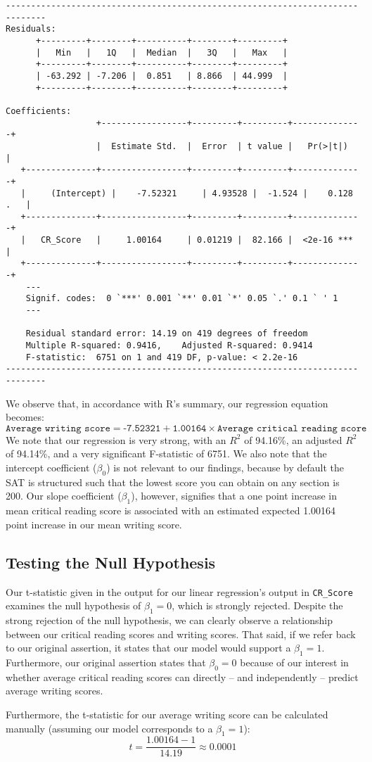 \documentclass[11pt]{article} %
\begin{document}
\begin{verbatim}
------------------------------------------------------------------------------
Residuals:
	  +---------+--------+----------+--------+---------+  
	  |   Min   |   1Q   |  Median  |   3Q   |   Max   |
	  +---------+--------+----------+--------+---------+  
	  | -63.292 | -7.206 |  0.851   | 8.866  | 44.999  |
	  +---------+--------+----------+--------+---------+ 
	
Coefficients:
                  +-----------------+---------+---------+--------------+
                  |  Estimate Std.  |  Error  | t value |   Pr(>|t|)   |
   +--------------+-----------------+---------+---------+--------------+
   |	 (Intercept) |    -7.52321     | 4.93528 |  -1.524 |    0.128 .   |
   +--------------+-----------------+---------+---------+--------------+
   |   CR_Score   |     1.00164     | 0.01219 |  82.166 |  <2e-16 ***  |
   +--------------+-----------------+---------+---------+--------------+
    ---
    Signif. codes:  0 `***' 0.001 `**' 0.01 `*' 0.05 `.' 0.1 ` ' 1
    ---
	
	Residual standard error: 14.19 on 419 degrees of freedom
	Multiple R-squared: 0.9416,	   Adjusted R-squared: 0.9414 
	F-statistic:  6751 on 1 and 419 DF, p-value: < 2.2e-16
------------------------------------------------------------------------------
\end{verbatim}

\noindent We observe that, in accordance with \textsc{R}'s summary, our regression equation becomes:
\[ \texttt{Average writing score} = \texttt{-7.52321} + \texttt{1.00164} \times \texttt{Average critical reading score} \]
We note that our regression is very strong, with an $R^{2}$ of 94.16\%, an adjusted $R^{2}$ of 94.14\%, and a very significant F-statistic of 6751. We also note that the intercept coefficient ($\beta_0$) is not relevant to our findings, because by default the SAT is structured such that the lowest score you can obtain on any section is 200. Our slope coefficient ($\beta_1$), however, signifies that a one point increase in mean critical reading score is associated with an estimated expected 1.00164 point increase in our mean writing score.

\subsection*{Testing the Null Hypothesis}
Our t-statistic given in the output for our linear regression's output in \texttt{CR\_Score} examines the null hypothesis of $\beta_1 = 0$, which is strongly rejected. Despite the strong rejection of the null hypothesis, we can clearly observe a relationship between our critical reading scores and writing scores. That said, if we refer back to our original assertion, it states that our model would support a $\beta_1 = 1$. Furthermore, our original assertion states that $\beta_0 = 0$ because of our interest in whether average critical reading scores can directly -- and independently -- predict average writing scores. \par
Furthermore, the t-statistic for our average writing score can be calculated manually (assuming our model corresponds to a $\beta_1 = 1$):
\[ t = \frac{1.00164 - 1}{14.19} \approx 0.0001 \]
\end{document}
